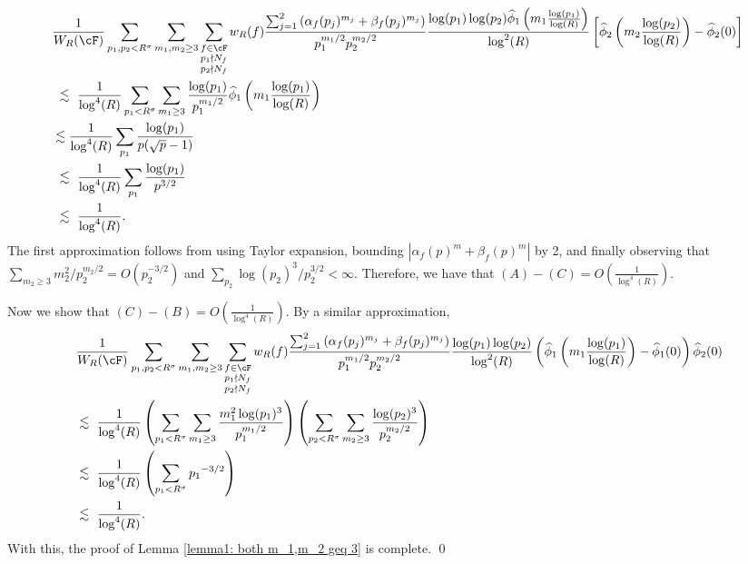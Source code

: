 \documentclass[11pt, reqno]{amsart}
\theoremstyle{definition}
\theoremstyle{remark}
\numberwithin{equation}{section}
\renewcommand{\hat}{\widehat}
\begin{document}
\footnotesize\begin{align*}\label{lemma.A-C}
&\frac{1}{W_R(\cF)}\sum_{p_1,p_2<R^\sigma}\sum_{m_1,m_2 \geq 3 }\sum_{\substack{f\in \cF\\p_1\nmid N_f\\p_2\nmid N_f }}w_R(f)\frac{\sum_{j=1}^2\left(\alpha_f(p_j)^{m_j}+\beta_f(p_j)^{m_j}\right)}{p_1^{m_1/2}p_2^{m_2/2}}
       \frac{\log(p_1)\log (p_2)\hat\phi_1 \left(m_1 \frac{\log(p_1)}{\log(R)}\right)}{\log^2(R)} \left[\hat\phi_2 \left(m_2 \frac{\log(p_2)}{\log(R)}\right) - \hat\phi_2(0)\right]
       \\
       &\ \lesssim  \  \frac{1}{\log^4(R)}\sum_{p_1<R^\sigma}\sum_{m_1\geq 3} \frac{\log(p_1)}{p_1^{m_1/2}}\hat\phi_1\left(m_1\frac{\log(p_1)} {\log(R)}\right)\\ &
       \lesssim \frac{1}{\log^4(R)}\sum_{p_1}\frac{\log(p_1)}{p(\sqrt{p}-1)}\\
       &\ \lesssim  \ \frac{1}{\log^4(R)}\sum_{p_1}\frac{\log(p_1)}{p^{3/2}}\\
       &\ \lesssim  \ \frac{1}{\log^4(R)}.
    \end{align*}\normalsize
The first approximation follows from using Taylor expansion, bounding $|\alpha_f(p)^m + \beta_f(p)^m|$ by 2, and finally observing that $\sum_{m_2\geq3 } {m_2^2}/{p_2^{m_2/2}} = O(p_2^{-3/2})$ and $\sum_{p_2}\log(p_2)^3/p_2^{3/2} < \infty.$ Therefore, we have that $(A)-(C) = O\left(\frac{1}{\log^4(R)}\right)$. 

Now we show that $(C)-(B)= O\left(\frac{1}{\log^4(R)}\right)$. By a similar approximation,   \small\begin{align*}
&\frac{1}{W_R(\cF)}\sum_{p_1,p_2<R^\sigma}\sum_{m_1,m_2 \geq 3 }\sum_{\substack{f\in \cF\\p_1\nmid N_f\\p_2\nmid N_f }}w_R(f)\frac{\sum_{j=1}^2\left(\alpha_f(p_j)^{m_j}+\beta_f(p_j)^{m_j}\right)}{p_1^{m_1/2}p_2^{m_2/2}}
       \frac{\log(p_1)\log (p_2)}{\log^2(R)}       \left(\hat\phi_1 \left(m_1 \frac{\log(p_1)}{\log(R)}\right)-\hat\phi_1(0)\right)\hat\phi_2(0) \\  \ &\lesssim \ \frac{1}{\log^4(R)} \left(\sum_{p_1<R^\sigma}\sum_{m_1\geq 3}\frac{m_1^2\log(p_1)^3}{p_1^{m_1/2}}\right)\left(\sum_{p_2<R^\sigma}\sum_{m_2\geq 3}\frac{\log(p_2)^3}{p_2^{m_2/2}}\right)\\ \ &\lesssim\  \frac{1}{\log^4(R)}\left(\sum_{p_1<R^\sigma}{p_1}^{-3/2}\right)\\ \ &\lesssim  \ 
       \frac{1}{\log^4(R)}.
    \end{align*}\normalsize
With this, the proof of Lemma \ref{lemma1: both m_1,m_2 geq 3} is complete.
\qed
\end{document}
